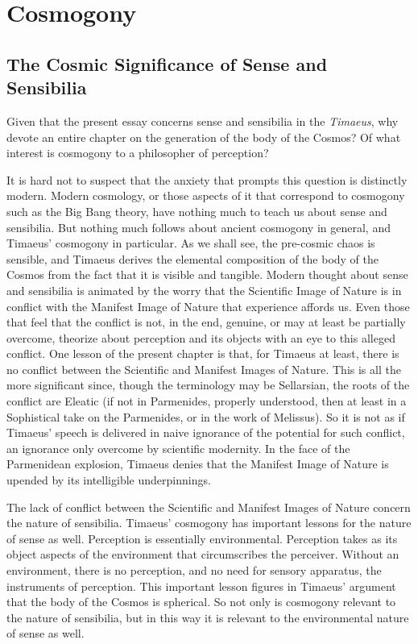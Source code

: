 \chapter{Cosmogony} %
\label{cha:cosmogony}

\section{The Cosmic Significance of Sense and Sensibilia} %
\label{sec:the_cosmic_significance_of_sensibilia}

Given that the present essay concerns sense and sensibilia in the \emph{Timaeus}, why devote an entire chapter on the generation of the body of the Cosmos? Of what interest is cosmogony to a philosopher of perception? 

It is hard not to suspect that the anxiety that prompts this question is distinctly modern. Modern cosmology, or those aspects of it that correspond to cosmogony such as the Big Bang theory, have nothing much to teach us about sense and sensibilia. But nothing much follows about ancient cosmogony in general, and Timaeus' cosmogony in particular. As we shall see, the pre-cosmic chaos is sensible, and Timaeus derives the elemental composition of the body of the Cosmos from the fact that it is visible and tangible. Modern thought about sense and sensibilia is animated by the worry that the Scientific Image of Nature is in conflict with the Manifest Image of Nature that experience affords us. Even those that feel that the conflict is not, in the end, genuine, or may at least be partially overcome, theorize about perception and its objects with an eye to this alleged conflict. One lesson of the present chapter is that, for Timaeus at least, there is no conflict between the Scientific and Manifest Images of Nature. This is all the more significant since, though the terminology may be Sellarsian, the roots of the conflict are Eleatic (if not in Parmenides, properly understood, then at least in a Sophistical take on the Parmenides, or in the work of Melissus). So it is not as if Timaeus' speech is delivered in naive ignorance of the potential for such conflict, an ignorance only overcome by scientific modernity. In the face of the Parmenidean explosion, Timaeus denies that the Manifest Image of Nature is upended by its intelligible underpinnings. 

The lack of conflict between the Scientific and Manifest Images of Nature concern the nature of sensibilia. Timaeus' cosmogony has important lessons for the nature of sense as well. Perception is essentially environmental. Perception takes as its object aspects of the environment that circumscribes the perceiver. Without an environment, there is no perception, and no need for sensory apparatus, the instruments of perception. This important lesson figures in Timaeus' argument that the body of the Cosmos is spherical. So not only is cosmogony relevant to the nature of sensibilia, but in this way it is relevant to the environmental nature of sense as well.

